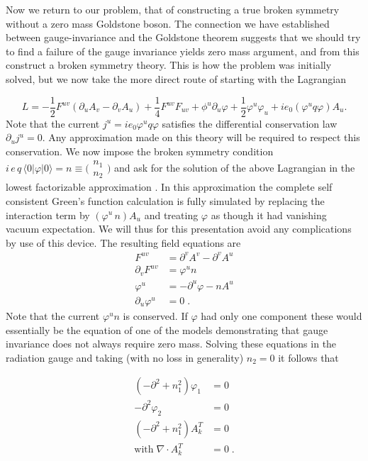 \documentclass[%
  12pt,
  paper=letter,
  abstracton,
  pagesize=auto,
  version=last,
  DIV=calc
  ]{article}
\begin{document}
Now we return to our problem, that of constructing a true broken
symmetry without a zero mass Goldstone boson.  The connection we have
established between gauge-invariance and the Goldstone theorem
suggests that we should try to find a failure of the gauge invariance
yields zero mass argument, and from this construct a broken symmetry
theory.  This is how the problem was initially solved, but we now take
the more direct route of starting with the Lagrangian

\begin{equation*}
L=-\frac{1}{2}F^{uv} (\partial_u A_v - \partial_v A_u)+\frac{1}{4} F^{uv} F_{uv} + \phi^u \partial_u \varphi + \frac{1}{2} \varphi^u \varphi_u + i e_0 (\varphi^u q \varphi) A_u.
\end{equation*}
Note that the current $j^u=i e_0 \varphi^u q \varphi$
satisfies the differential conservation law $\partial_u j^u=0$.  Any
approximation made on this theory will be required to respect this
conservation. We now impose the broken symmetry condition $i\, e\, q\,
\langle 0|\varphi|0\rangle = n \equiv \bigl(\begin{smallmatrix}n_1 \\n_2\end{smallmatrix}\bigr)$ and ask for the solution
of the above Lagrangian in the lowest factorizable approximation
\cite{13}.  In this approximation the complete self consistent Green's
function calculation is fully simulated by replacing the interaction
term by $(\varphi^u\, n)A_u$ and treating $\varphi$ as though it had
vanishing vacuum expectation.  We will thus for this presentation
avoid any complications by use of this device.  The resulting field
equations are
\begin{align*}
F^{uv} &=\partial^v A^v-\partial^v A^u \\
\partial_v F^{uv} &=\varphi^u n \\
\varphi^u &=-\partial^u\varphi-n A^u\\
\partial_u\varphi^u &=0\; .
\end{align*}
Note that the current $\varphi^u n$ is conserved.  If $\varphi$ had
only one component these would essentially be the equation of one of
the models \cite {14} demonstrating that gauge invariance does not
always require zero mass.  Solving these equations in the radiation
gauge and taking (with no loss in generality) $n_2=0$ it follows that

\begin{align*}
(-\partial^2+n^2_1)\varphi_1 &=0 \\
-\partial^2\varphi_2 &=0 \\
(-\partial^2+n^2_1) A^T_k &=0 \\
\text{with}\; \nabla\cdot A^T_k &=0 \; .
\end{align*}
\end{document}
